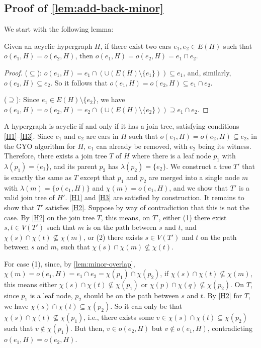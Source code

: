\subsection{Proof of \cref{lem:add-back-minor}}

We start with the following lemma:

\begin{lemma} \label{lem:minor-overlap}
    Given an acyclic hypergraph $H$, if there exist two ears $e_1, e_2 \in E(H)$ such that $o(e_1, H) = o(e_2, H)$, then $o(e_1, H) = o(e_2, H) = e_1 \cap e_2$.
\end{lemma}

\begin{proof}
    ($\subseteq$): $o(e_1, H) = e_1 \cap (\cup (E(H) \setminus \{ e_1 \})) \subseteq e_1$, and, similarly, $o(e_2, H) \subseteq e_2$. So it follows that $o(e_1, H) = o(e_2, H) \subseteq e_1 \cap e_2$.

    ($\supseteq$): Since $e_1 \in E(H) \setminus \{ e_2 \}$, we have $o(e_1, H) = o(e_2, H) = e_2 \cap (\cup (E(H) \setminus \{ e_2 \})) \supseteq e_1 \cap e_2$.
\end{proof}

    A hypergraph is acyclic if and only if it has a join tree, satisfying conditions \ref{H1}--\ref{H3}.
    Since $e_1$ and $e_2$ are ears in $H$ such that $o(e_1, H) = o(e_2, H) \subseteq e_2$, in the GYO algorithm for $H$, $e_1$ can already be removed, with $e_2$ being its witness.
    Therefore, there exists a join tree $T$ of $H$ where there is a leaf node $p_1$ with $\lambda(p_1) = \{ e_1 \}$, and its parent $p_2$ has $\lambda(p_2) = \{ e_2 \}$. We construct a tree $T'$ that is exactly the same as $T$ except that $p_1$ and $p_2$ are merged into a single node $m$ with $\lambda(m) = \{ o(e_1, H) \}$ and $\chi(m) = o(e_1, H)$, and we show that $T'$ is a valid join tree of $H'$.
    \ref{H1} and \ref{H3} are satisfied by construction.
    It remains to show that $T'$ satisfies \ref{H2}.
    Suppose by way of contradiction that this is not the case.
    By \ref{H2} on the join tree $T$, this means, on $T'$, either (1) there exist $s, t \in V(T')$ such that $m$ is on the path between $s$ and $t$, and $\chi(s) \cap \chi(t) \not\subseteq \chi(m)$, or (2) there exists $s \in V(T')$ and $t$ on the path between $s$ and $m$, such that $\chi(s) \cap \chi(m) \not\subseteq \chi(t)$.
    
    For case (1), since, by \cref{lem:minor-overlap}, $\chi(m) = o(e_1, H) = e_1 \cap e_2 = \chi(p_1) \cap \chi(p_2)$,
    if $\chi(s) \cap \chi(t) \not\subseteq \chi(m)$,
    this means either $\chi(s) \cap \chi(t) \not\subseteq \chi(p_1)$
    or $\chi(p) \cap \chi(q) \not\subseteq \chi(p_2)$.
    On $T$, since $p_1$ is a leaf node, $p_2$ should be on the path between $s$ and $t$.
    By \ref{H2} for $T$, we have $\chi(s) \cap \chi(t) \subseteq \chi(p_2)$.
    So it can only be that $\chi(s) \cap \chi(t) \not\subseteq \chi(p_1)$, i.e., there exists some $v \in \chi(s) \cap \chi(t) \subseteq \chi(p_2)$ such that $v \not\in \chi(p_1)$.
    But then, $v \in o(e_2, H)$ but $v \not\in o(e_1, H)$, contradicting $o(e_1, H) = o(e_2, H)$.
    
